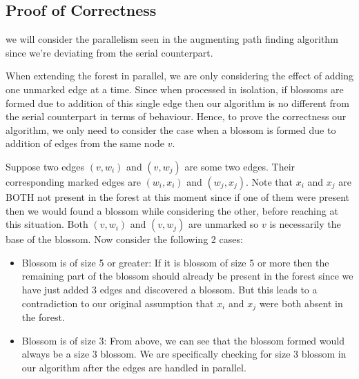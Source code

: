 \subsection{Proof of Correctness}
we will consider the parallelism seen in the augmenting path finding algorithm since we're deviating from the serial counterpart.

When extending the forest in parallel, we are only considering the effect of adding one unmarked edge at a time. Since when processed in isolation, if blossoms are formed due to addition of this single edge then our algorithm is no different from the serial counterpart in terms of behaviour. Hence, to prove the correctness our algorithm, we only need to consider the case when a blossom is formed due to addition of edges from the same node $v$.

Suppose two edges $(v, w_i)$ and $(v, w_j)$ are some two edges. Their corresponding marked edges are $(w_i, x_i)$ and $(w_j, x_j)$. Note that $x_i$ and $x_j$ are BOTH not present in the forest at this moment since if one of them were present then we would found a blossom while considering the other, before reaching at this situation. Both $(v, w_i)$ and $(v, w_j)$ are unmarked so $v$ is necessarily the base of the blossom. Now consider the following 2 cases:
\begin{itemize}
    \item Blossom is of size 5 or greater: If it is blossom of size 5 or more then the remaining part of the blossom should already be present in the forest since we have just added 3 edges and discovered a blossom. But this leads to a contradiction to our original assumption that $x_i$ and $x_j$ were both absent in the forest.
    \item Blossom is of size 3: From above, we can see that the blossom formed would always be a size 3 blossom. We are specifically checking for size 3 blossom in our algorithm after the edges are handled in parallel.
\end{itemize}

